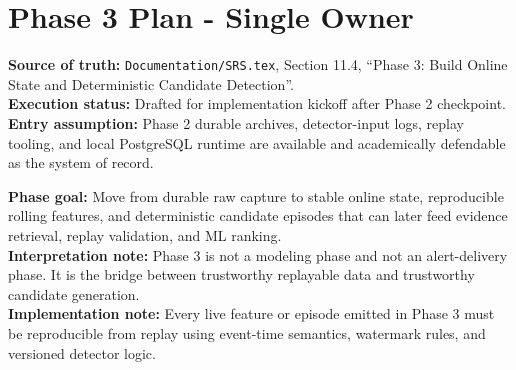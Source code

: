 \documentclass{article}
\begin{document}
\section*{Phase 3 Plan - Single Owner}

\textbf{Source of truth:} \texttt{Documentation/SRS.tex}, Section 11.4, ``Phase 3: Build Online State and Deterministic Candidate Detection''.\\
\textbf{Execution status:} Drafted for implementation kickoff after Phase 2 checkpoint.\\
\textbf{Entry assumption:} Phase 2 durable archives, detector-input logs, replay tooling, and local PostgreSQL runtime are available and academically defendable as the system of record.

\textbf{Phase goal:} Move from durable raw capture to stable online state, reproducible rolling features, and deterministic candidate episodes that can later feed evidence retrieval, replay validation, and ML ranking.\\
\textbf{Interpretation note:} Phase 3 is not a modeling phase and not an alert-delivery phase. It is the bridge between trustworthy replayable data and trustworthy candidate generation.\\
\textbf{Implementation note:} Every live feature or episode emitted in Phase 3 must be reproducible from replay using event-time semantics, watermark rules, and versioned detector logic.
\end{document}
